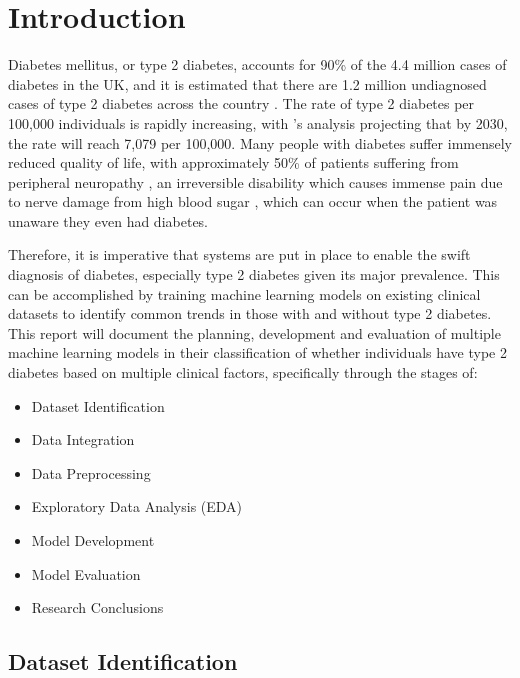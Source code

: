 \documentclass[12pt]{report}
\newcommand{\para}{\vspace{8pt}\noindent}
\begin{document}
\chapter{Introduction}

Diabetes mellitus, or type 2 diabetes, accounts for 90\% of the 4.4 million cases of diabetes in the UK, and it is estimated that 
there are 1.2 million undiagnosed cases of type 2 diabetes across the country \autocite{diabetes_uk_how_nodate}. The rate of type 
2 diabetes per 100,000 individuals is rapidly increasing, with \textcite{khan_epidemiology_2020}'s analysis projecting that by 
2030, the rate will reach 7,079 per 100,000. Many people with diabetes suffer immensely reduced quality of life, with approximately 50\% 
of patients suffering from peripheral neuropathy \autocite{dhanapalaratnam_effect_2024}, an irreversible disability which causes immense pain due 
to nerve damage from high blood sugar \autocite{nhs_peripheral_2022}, which can occur when the patient was unaware they even 
had diabetes. 

\para
Therefore, it is imperative that systems are put in place to enable the swift diagnosis of diabetes, especially type 2 diabetes 
given its major prevalence. This can be accomplished by training machine learning models on existing clinical datasets 
to identify common trends in those with and without type 2 diabetes. This report will document the planning, development 
and evaluation of multiple machine learning models in their classification of whether individuals have type 2 diabetes based 
on multiple clinical factors, specifically through the stages of:

\begin{itemize}
    \item Dataset Identification
    \item Data Integration
    \item Data Preprocessing
    \item Exploratory Data Analysis (EDA)
    \item Model Development 
    \item Model Evaluation
    \item Research Conclusions
\end{itemize}

\pagebreak 
\section{Dataset Identification}
\end{document}
